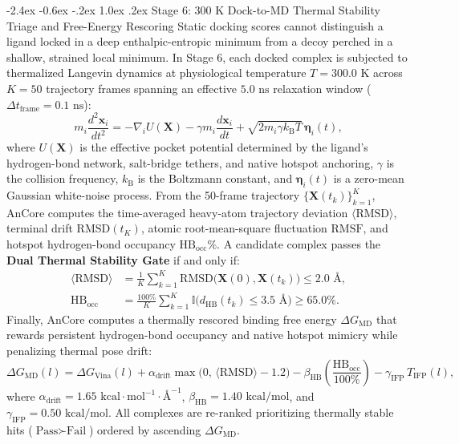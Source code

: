 \documentclass[11pt,a4paper]{article}
\makeatletter
\renewcommand{\subsection}{\@startsection{subsection}{2}{\z@}%
  {-2.4ex \@plus -0.6ex \@minus -.2ex}%
  {1.0ex \@plus .2ex}%
  {\normalfont\large\bfseries\color{primary}}}
\makeatother
\begin{document}
\subsection{Stage 6: 300 K Dock-to-MD Thermal Stability Triage and Free-Energy Rescoring}
\noindent Static docking scores cannot distinguish a ligand locked in a deep enthalpic-entropic minimum from a decoy perched in a shallow, strained local minimum. In Stage 6, each docked complex is subjected to thermalized Langevin dynamics at physiological temperature $T = 300.0\text{ K}$ across $K = 50$ trajectory frames spanning an effective $5.0\text{ ns}$ relaxation window ($\Delta t_{\text{frame}} = 0.1\text{ ns}$):
\begin{equation}
m_i \frac{d^2 \mathbf{x}_i}{dt^2} = -\nabla_i U(\mathbf{X}) - \gamma m_i \frac{d\mathbf{x}_i}{dt} + \sqrt{2 m_i \gamma k_{\text{B}} T}\,\boldsymbol{\eta}_i(t),
\label{eq:langevin}
\end{equation}
where $U(\mathbf{X})$ is the effective pocket potential determined by the ligand's hydrogen-bond network, salt-bridge tethers, and native hotspot anchoring, $\gamma$ is the collision frequency, $k_{\text{B}}$ is the Boltzmann constant, and $\boldsymbol{\eta}_i(t)$ is a zero-mean Gaussian white-noise process. From the 50-frame trajectory $\{\mathbf{X}(t_k)\}_{k=1}^{K}$, AnCore computes the time-averaged heavy-atom trajectory deviation $\langle\text{RMSD}\rangle$, terminal drift $\text{RMSD}(t_K)$, atomic root-mean-square fluctuation $\text{RMSF}$, and hotspot hydrogen-bond occupancy $\text{HB}_{\text{occ}}\%$. A candidate complex passes the \textbf{Dual Thermal Stability Gate} if and only if:
\begin{equation}
\begin{aligned}
\langle\text{RMSD}\rangle &= \frac{1}{K}\sum_{k=1}^{K} \text{RMSD}\bigl(\mathbf{X}(0), \mathbf{X}(t_k)\bigr) \le 2.0\text{ \AA}, \\
\text{HB}_{\text{occ}} &= \frac{100\%}{K}\sum_{k=1}^{K} \mathbb{I}\bigl(d_{\text{HB}}(t_k) \le 3.5\text{ \AA}\bigr) \ge 65.0\%.
\end{aligned}
\label{eq:mdgate}
\end{equation}
Finally, AnCore computes a thermally rescored binding free energy $\Delta G_{\text{MD}}$ that rewards persistent hydrogen-bond occupancy and native hotspot mimicry while penalizing thermal pose drift:
\begin{equation}
\Delta G_{\text{MD}}(l) = \Delta G_{\text{Vina}}(l) + \alpha_{\text{drift}} \max\bigl(0,\, \langle\text{RMSD}\rangle - 1.2\bigr) - \beta_{\text{HB}} \left(\frac{\text{HB}_{\text{occ}}}{100\%}\right) - \gamma_{\text{IFP}}\, T_{\text{IFP}}(l),
\label{eq:mdrescore}
\end{equation}
where $\alpha_{\text{drift}} = 1.65\text{ kcal}\cdot\text{mol}^{-1}\cdot\text{\AA}^{-1}$, $\beta_{\text{HB}} = 1.40\text{ kcal/mol}$, and $\gamma_{\text{IFP}} = 0.50\text{ kcal/mol}$. All complexes are re-ranked prioritizing thermally stable hits ($\text{Pass} \succ \text{Fail}$) ordered by ascending $\Delta G_{\text{MD}}$.
\end{document}
